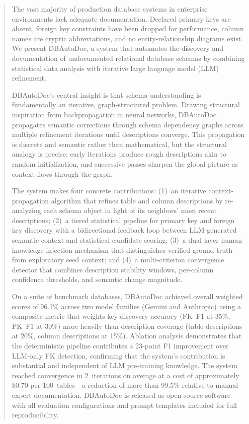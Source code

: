 \documentclass[twocolumn]{svjour3}
\begin{document}
\begin{abstract}
The vast majority of production database systems in enterprise environments lack adequate documentation. Declared primary keys are absent, foreign key constraints have been dropped for performance, column names are cryptic abbreviations, and no entity-relationship diagrams exist. We present DBAutoDoc, a system that automates the discovery and documentation of undocumented relational database schemas by combining statistical data analysis with iterative large language model (LLM) refinement.

DBAutoDoc's central insight is that schema understanding is fundamentally an iterative, graph-structured problem. Drawing structural inspiration from backpropagation in neural networks, DBAutoDoc propagates semantic corrections through schema dependency graphs across multiple refinement iterations until descriptions converge. This propagation is discrete and semantic rather than mathematical, but the structural analogy is precise: early iterations produce rough descriptions akin to random initialization, and successive passes sharpen the global picture as context flows through the graph.

The system makes four concrete contributions: (1)~an iterative context-propagation algorithm that refines table and column descriptions by re-analyzing each schema object in light of its neighbors' most recent descriptions; (2)~a tiered statistical pipeline for primary key and foreign key discovery with a bidirectional feedback loop between LLM-generated semantic context and statistical candidate scoring; (3)~a dual-layer human knowledge injection mechanism that distinguishes verified ground truth from exploratory seed context; and (4)~a multi-criterion convergence detector that combines description stability windows, per-column confidence thresholds, and semantic change magnitude.

On a suite of benchmark databases, DBAutoDoc achieved overall weighted scores of 96.1\% across two model families (Gemini and Anthropic) using a composite metric that weights key discovery accuracy (FK~F1 at 35\%, PK~F1 at 30\%) more heavily than description coverage (table descriptions at 20\%, column descriptions at 15\%). Ablation analysis demonstrates that the deterministic pipeline contributes a 23-point F1 improvement over LLM-only FK detection, confirming that the system's contribution is substantial and independent of LLM pre-training knowledge. The system reached convergence in 2~iterations on average at a cost of approximately \$0.70 per 100~tables---a reduction of more than 99.5\% relative to manual expert documentation. DBAutoDoc is released as open-source software with all evaluation configurations and prompt templates included for full reproducibility.
\end{abstract}
\end{document}
